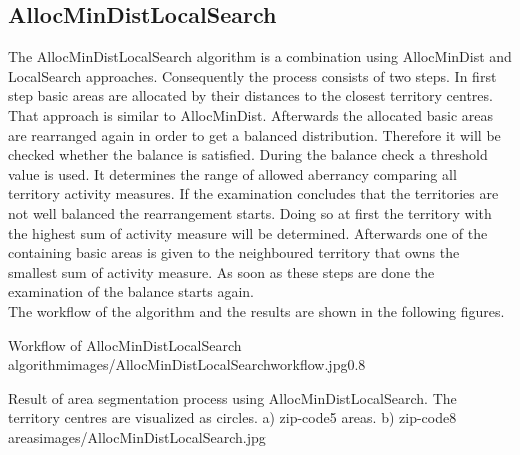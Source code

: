 \subsection{AllocMinDistLocalSearch}
The AllocMinDistLocalSearch algorithm is a combination using AllocMinDist and LocalSearch approaches. Consequently the process consists of two steps. In first step basic areas are allocated by their distances to the closest territory centres. That approach is similar to AllocMinDist. Afterwards the allocated basic areas are rearranged again in order to get a balanced distribution. Therefore it will be checked whether the balance is satisfied. During the balance check a threshold value is used. It determines the range of allowed aberrancy comparing all territory activity measures. If the examination concludes that the territories are not well balanced the rearrangement starts. Doing so at first the territory with the highest sum of activity measure will be determined. Afterwards one of the containing basic areas is given to the neighboured territory that owns the smallest sum of activity measure. As soon as these steps are done the examination of the balance starts again.\\
The workflow of the algorithm and the results are shown in the following figures.

\begin{figurevarSize}{Workflow of AllocMinDistLocalSearch algorithm}{images/AllocMinDistLocalSearchworkflow.jpg}{0.8}\end{figurevarSize}


\begin{figureOwn}{Result of area segmentation process using AllocMinDistLocalSearch. The territory centres are visualized as circles. a) zip-code5 areas. b) zip-code8 areas}{images/AllocMinDistLocalSearch.jpg}\end{figureOwn}



